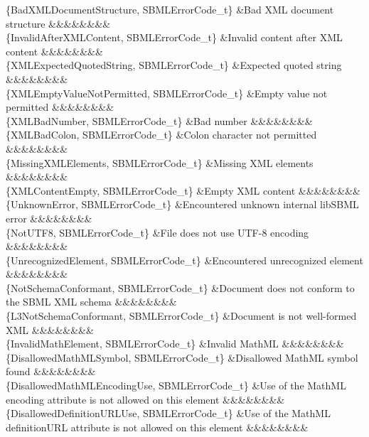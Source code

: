 \begin{DoxyParagraph}{}
\begin{longtabu}
\{Bad\+X\+M\+L\+Document\+Structure, S\+B\+M\+L\+Error\+Code\+\_\+t\} &Bad X\+ML document structure &&&&&&&&\\
\{Invalid\+After\+X\+M\+L\+Content, S\+B\+M\+L\+Error\+Code\+\_\+t\} &Invalid content after X\+ML content &&&&&&&&\\
\{X\+M\+L\+Expected\+Quoted\+String, S\+B\+M\+L\+Error\+Code\+\_\+t\} &Expected quoted string &&&&&&&&\\
\{X\+M\+L\+Empty\+Value\+Not\+Permitted, S\+B\+M\+L\+Error\+Code\+\_\+t\} &Empty value not permitted &&&&&&&&\\
\{X\+M\+L\+Bad\+Number, S\+B\+M\+L\+Error\+Code\+\_\+t\} &Bad number &&&&&&&&\\
\{X\+M\+L\+Bad\+Colon, S\+B\+M\+L\+Error\+Code\+\_\+t\} &Colon character not permitted &&&&&&&&\\
\{Missing\+X\+M\+L\+Elements, S\+B\+M\+L\+Error\+Code\+\_\+t\} &Missing X\+ML elements &&&&&&&&\\
\{X\+M\+L\+Content\+Empty, S\+B\+M\+L\+Error\+Code\+\_\+t\} &Empty X\+ML content &&&&&&&&\\
\{Unknown\+Error, S\+B\+M\+L\+Error\+Code\+\_\+t\} &Encountered unknown internal lib\+S\+B\+ML error &&&&&&&&\\
\{Not\+U\+T\+F8, S\+B\+M\+L\+Error\+Code\+\_\+t\} &File does not use U\+T\+F-\/8 encoding &&&&&&&&\\
\{Unrecognized\+Element, S\+B\+M\+L\+Error\+Code\+\_\+t\} &Encountered unrecognized element &&&&&&&&\\
\{Not\+Schema\+Conformant, S\+B\+M\+L\+Error\+Code\+\_\+t\} &Document does not conform to the S\+B\+ML X\+ML schema &&&&&&&&\\
\{L3\+Not\+Schema\+Conformant, S\+B\+M\+L\+Error\+Code\+\_\+t\} &Document is not well-\/formed X\+ML &&&&&&&&\\
\{Invalid\+Math\+Element, S\+B\+M\+L\+Error\+Code\+\_\+t\} &Invalid Math\+ML &&&&&&&&\\
\{Disallowed\+Math\+M\+L\+Symbol, S\+B\+M\+L\+Error\+Code\+\_\+t\} &Disallowed Math\+ML symbol found &&&&&&&&\\
\{Disallowed\+Math\+M\+L\+Encoding\+Use, S\+B\+M\+L\+Error\+Code\+\_\+t\} &Use of the Math\+ML \textquotesingle{}encoding\textquotesingle{} attribute is not allowed on this element &&&&&&&&\\
\{Disallowed\+Definition\+U\+R\+L\+Use, S\+B\+M\+L\+Error\+Code\+\_\+t\} &Use of the Math\+ML \textquotesingle{}definition\+U\+RL\textquotesingle{} attribute is not allowed on this element &&&&&&&&\\

\end{longtabu}
\end{DoxyParagraph}
